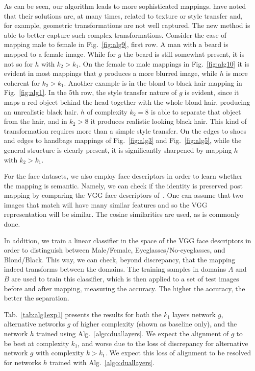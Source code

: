 \documentclass{article} %
\begin{document}
As can be seen, our algorithm leads to more sophisticated mappings. \cite{discogan} have noted that their solutions are, at many times, related to texture or style transfer and, for example, geometric transformations are not well captured. The new method is able to better capture such complex transformations. Consider the case of mapping male to female in Fig.~\ref{fig:alg9}, first row. A man with a beard is mapped to a female image. While for $g$ the beard is still somewhat present, it is not so for $h$ with $k_2>k_1$. On the female to male mappings in Fig.~\ref{fig:alg10} it is evident in most mappings that $g$ produces a more blurred image, while $h$ is more coherent for $k_2>k_1$. 
Another example is in the blond to black hair mapping in Fig.~\ref{fig:alg1}. In the 5th row, the style transfer nature of $g$ is evident, since it maps a red object behind the head together with the whole blond hair, producing an unrealistic black hair. $h$ of complexity $k_2=8$ is able to separate that object from the hair, and in $k_2>8$ it produces realistic looking black hair. This kind of transformation requires more than a simple style transfer. On the edges to shoes and edges to handbags mappings of Fig.~\ref{fig:alg3} and Fig.~\ref{fig:alg5}, while the general structure is clearly present, it is significantly sharpened by mapping $h$ with $k_2>k_1$. 

For the face datasets, we also employ face descriptors in order to learn whether the mapping is semantic. Namely, we can check if the identity is preserved post mapping by comparing the VGG face descriptors of~\cite{Parkhi15}. One can assume that two images that match will have many similar features and so the VGG representation will be similar. The cosine similarities are used, as is commonly done. 

In addition, we train a linear classifier in the space of the VGG face descriptors in order to distinguish between Male/Female, Eyeglasses/No-eyeglasses, and Blond/Black. This way, we can check, beyond discrepancy, that the mapping indeed transforms between the domains. The training samples in domains $A$ and $B$ are used to train this classifier, which is then applied to a set of test images before and after mapping, measuring the accuracy. The higher the accuracy, the better the separation.

Tab.~\ref{tab:alg1exp1} presents the results for both the $k_1$ layers network $g$, alternative networks $g$ of higher complexity (shown as baseline only), and the network $h$ trained using Alg.~\ref{algo:duallayers}. 
We expect the alignment of $g$ to be best at complexity $k_1$, and worse due to the loss of discrepancy for alternative network $g$ with complexity $k>k_1$. We expect this loss of alignment to be resolved for networks $h$ trained with Alg.~\ref{algo:duallayers}.
\end{document}

